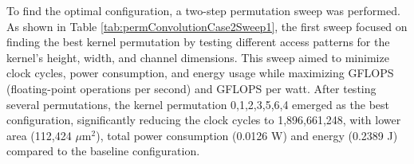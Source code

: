 To find the optimal configuration, a two-step permutation sweep was performed. As shown in Table \ref{tab:permConvolutionCase2Sweep1}, the first sweep focused on finding the best kernel permutation by testing different access patterns for the kernel’s height, width, and channel dimensions. This sweep aimed to minimize clock cycles, power consumption, and energy usage while maximizing GFLOPS (floating-point operations per second) and GFLOPS per watt. After testing several permutations, the kernel permutation 0,1,2,3,5,6,4 emerged as the best configuration, significantly reducing the clock cycles to 1,896,661,248, with lower area (112,424 $\mu\text{m}^2$), total power consumption (0.0126 W) and energy (0.2389 J) compared to the baseline configuration.
\\
\begin{table}[H]
\centering
\caption{Second sweep (output permutation)}
\label{tab:permConvolutionCase2Sweep2}
\end{table}

